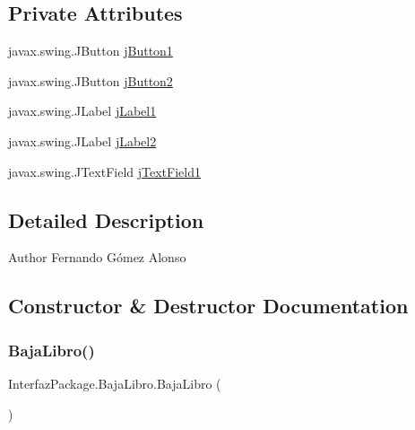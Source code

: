 \subsection*{Private Attributes}
\begin{DoxyCompactItemize}
\item 
javax.\+swing.\+J\+Button \mbox{\hyperlink{class_interfaz_package_1_1_baja_libro_ad62adfcc532334f669bfaf40af59fa81}{j\+Button1}}
\item 
javax.\+swing.\+J\+Button \mbox{\hyperlink{class_interfaz_package_1_1_baja_libro_a2da0b911c31a5ee87f05b4a630fa5b2d}{j\+Button2}}
\item 
javax.\+swing.\+J\+Label \mbox{\hyperlink{class_interfaz_package_1_1_baja_libro_ae5a57149ebdb3f8259cd7f0bee7684c4}{j\+Label1}}
\item 
javax.\+swing.\+J\+Label \mbox{\hyperlink{class_interfaz_package_1_1_baja_libro_a6338f6b6d9f81c8b561ffeaa3e70b42d}{j\+Label2}}
\item 
javax.\+swing.\+J\+Text\+Field \mbox{\hyperlink{class_interfaz_package_1_1_baja_libro_a2b033ca044fbf57e3ee123d55b137e31}{j\+Text\+Field1}}
\end{DoxyCompactItemize}


\subsection{Detailed Description}
\begin{DoxyAuthor}{Author}
Fernando Gómez Alonso 
\end{DoxyAuthor}


\subsection{Constructor \& Destructor Documentation}
\mbox{\label{class_interfaz_package_1_1_baja_libro_a2675599a2976eb47169b0b174c7ee93a}} 
\subsubsection{\texorpdfstring{Baja\+Libro()}{BajaLibro()}}
{\footnotesize\ttfamily Interfaz\+Package.\+Baja\+Libro.\+Baja\+Libro (\begin{DoxyParamCaption}{ }\end{DoxyParamCaption})\hspace{0.3cm}{\ttfamily [inline]}}

